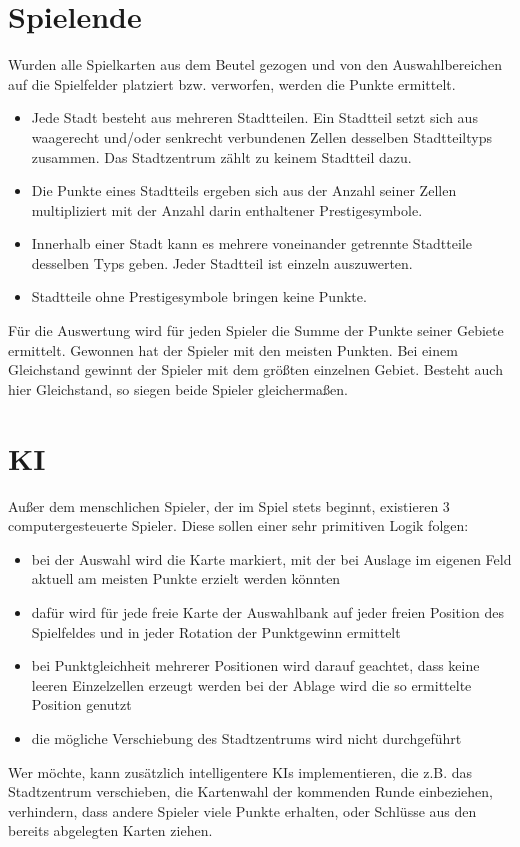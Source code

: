 \section{Spielende}
Wurden alle Spielkarten aus dem Beutel gezogen und von den Auswahlbereichen auf die Spielfelder platziert bzw. verworfen, werden die Punkte ermittelt.
\begin{itemize}
	\item Jede Stadt besteht aus mehreren Stadtteilen. Ein Stadtteil setzt sich aus waagerecht und/oder senkrecht verbundenen Zellen desselben Stadtteiltyps zusammen. Das Stadtzentrum zählt zu keinem Stadtteil dazu.
	\item Die Punkte eines Stadtteils ergeben sich aus der Anzahl seiner Zellen multipliziert mit der Anzahl darin enthaltener Prestigesymbole.
	\item Innerhalb einer Stadt kann es mehrere voneinander getrennte Stadtteile desselben Typs geben. Jeder Stadtteil ist einzeln auszuwerten.
	\item Stadtteile ohne Prestigesymbole bringen keine Punkte.
\end{itemize}
Für die Auswertung wird für jeden Spieler die Summe der Punkte seiner Gebiete ermittelt. Gewonnen hat der Spieler mit den meisten Punkten. Bei einem Gleichstand gewinnt der Spieler mit dem größten einzelnen Gebiet. Besteht auch hier Gleichstand, so siegen beide Spieler gleichermaßen.


\section{KI}
Außer dem menschlichen Spieler, der im Spiel stets beginnt, existieren 3 computergesteuerte Spieler. Diese sollen einer sehr primitiven Logik folgen:
\begin{itemize}
	\item bei der Auswahl wird die Karte markiert, mit der bei Auslage im eigenen Feld aktuell am meisten Punkte erzielt werden könnten
	\item dafür wird für jede freie Karte der Auswahlbank auf jeder freien Position des Spielfeldes und in jeder Rotation der Punktgewinn ermittelt
	\item bei Punktgleichheit mehrerer Positionen wird darauf geachtet, dass keine leeren Einzelzellen erzeugt werden
bei der Ablage wird die so ermittelte Position genutzt
	\item die mögliche Verschiebung des Stadtzentrums wird nicht durchgeführt
\end{itemize}
Wer möchte, kann zusätzlich intelligentere KIs implementieren, die z.B. das Stadtzentrum verschieben, die Kartenwahl der kommenden Runde einbeziehen, verhindern, dass andere Spieler viele Punkte erhalten, oder Schlüsse aus den bereits abgelegten Karten ziehen.



